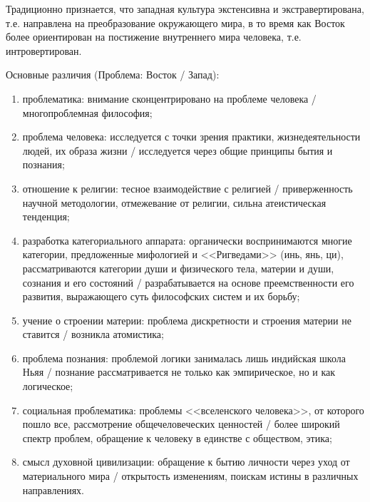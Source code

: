 Традиционно признается, что западная культура экстенсивна и экстравертирована, т.е. направлена на
преобразование окружающего мира, в то время как Восток более ориентирован на постижение внутреннего
мира человека, т.е. интровертирован.

Основные различия (Проблема: Восток / Запад):
\begin{enumerate}
    \vspace*{-1.8ex}
    \itemsep-1.2ex
    \item проблематика: внимание сконцентрировано на проблеме человека / многопроблемная философия;
    \item проблема человека: исследуется с точки зрения практики, жизнедеятельности людей, их образа
        жизни / исследуется через общие принципы бытия и познания;
    \item отношение к религии: тесное взаимодействие с религией / приверженность научной
        методологии, отмежевание от религии, сильна атеистическая тенденция;
    \item разработка категориального аппарата: органически воспринимаются многие категории,
        предложенные мифологией и <<Ригведами>> (инь, янь, ци), рассматриваются категории души и
        физического тела, материи и души, сознания и его состояний / разрабатывается на основе
        преемственности его развития, выражающего суть философских систем и их борьбу;
    \item учение о строении материи: проблема дискретности и строения материи не ставится / возникла
        атомистика;
    \item проблема познания: проблемой логики занималась лишь индий­ская школа Ньяя / познание
        рассматривается не только как эмпирическое, но и как логическое;
    \item социальная проблематика: проблемы <<вселенского человека>>, от которого пошло все,
        рассмотрение общечеловеческих ценностей / более широкий спектр проблем, обращение к человеку
        в единстве с обществом, этика;
    \item смысл духовной цивилизации: обращение к бытию личности через уход от материального мира /
        открытость изменениям, поискам истины в различных направлениях.
\end{enumerate}
